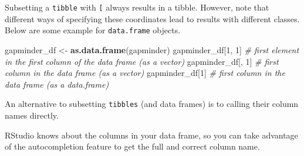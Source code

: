 \documentclass[
]{book}
\newenvironment{Shaded}{\begin{snugshade}}{\end{snugshade}}
\newcommand{\CommentTok}[1]{\textcolor[rgb]{0.56,0.35,0.01}{\textit{#1}}}
\newcommand{\DecValTok}[1]{\textcolor[rgb]{0.00,0.00,0.81}{#1}}
\newcommand{\FunctionTok}[1]{\textcolor[rgb]{0.13,0.29,0.53}{\textbf{#1}}}
\newcommand{\NormalTok}[1]{#1}
\newcommand{\OtherTok}[1]{\textcolor[rgb]{0.56,0.35,0.01}{#1}}
\newcommand{\SpecialCharTok}[1]{\textcolor[rgb]{0.81,0.36,0.00}{\textbf{#1}}}
\newcommand{\StringTok}[1]{\textcolor[rgb]{0.31,0.60,0.02}{#1}}
\begin{document}
Subsetting a \texttt{tibble} with \texttt{{[}} always results in a tibble. However, note that different ways of specifying these coordinates lead to results with different classes. Below are some example for \texttt{data.frame} objects.

\begin{Shaded}
\begin{Highlighting}[]
\NormalTok{gapminder\_df }\OtherTok{\textless{}{-}} \FunctionTok{as.data.frame}\NormalTok{(gapminder)}
\NormalTok{gapminder\_df[}\DecValTok{1}\NormalTok{, }\DecValTok{1}\NormalTok{]   }\CommentTok{\# first element in the first column of the data frame (as a vector)}
\NormalTok{gapminder\_df[, }\DecValTok{1}\NormalTok{]    }\CommentTok{\# first column in the data frame (as a vector)}
\NormalTok{gapminder\_df[}\DecValTok{1}\NormalTok{]      }\CommentTok{\# first column in the data frame (as a data.frame)}
\end{Highlighting}
\end{Shaded}

An alternative to subsetting \texttt{tibbles} (and data frames) is to calling their column names directly.

\begin{Shaded}
\end{Shaded}

RStudio knows about the columns in your data frame, so you can take advantage of the autocompletion feature to get the full and correct column name.
\end{document}
